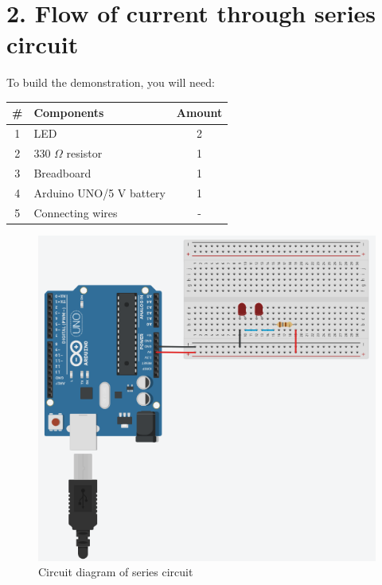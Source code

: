 \section*{2. Flow of current through series circuit}
To build the demonstration, you will need:

\begin{table}[!ht]
    \centering
    \begin{tabular}{|c|l|c|}\hline
    \textbf{\#} & \textbf{Components}  &  \textbf{Amount}\\\hline
    1   &   LED                     &   2\\\hline
    2   &   330 $\Omega$ resistor   &   1\\\hline
    3   &   Breadboard              &   1\\\hline
    4   &   Arduino UNO/5 V battery &   1\\\hline
    5   &   Connecting wires        &   -\\\hline
    \end{tabular}
\end{table}


\begin{figure}[!ht]
    \centering
    \includegraphics[scale=0.5]{Figures/electricity-series.PNG}
    \caption{Circuit diagram of series circuit}
    \label{fig:elec-s}
\end{figure}

